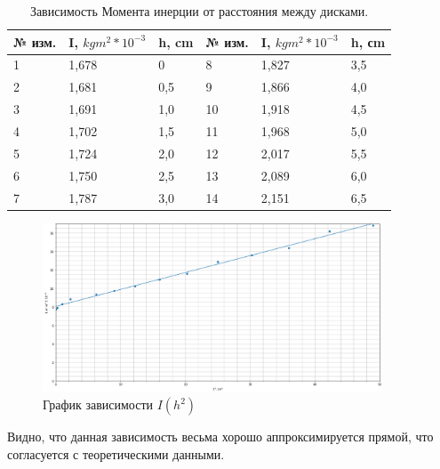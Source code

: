 \documentclass[a4, 12pt]{article}
\begin{document}
\begin{enumerate}
		\begin{table}[H]
			\begin{center}
				\begin{tabular}{| l | l | l || l | l | l |}
					\hline
					№ изм. & I, $kgm^2 * 10^{-3}$ & h, cm & № изм. & I, $kgm^2 * 10^{-3}$ & h, сm \\ \hline
					1 & 1,678 & 0 & 8 & 1,827 & 3,5 \\ \hline
					2 & 1,681 & 0,5 & 9 & 1,866 & 4,0 \\ \hline
					3 & 1,691 & 1,0 & 10 & 1,918 & 4,5 \\ \hline
					4 & 1,702 & 1,5 & 11 & 1,968 & 5,0 \\ \hline
					5 & 1,724 & 2,0 & 12 & 2,017 & 5,5 \\ \hline
					6 & 1,750 & 2,5 & 13 & 2,089 & 6,0 \\ \hline
					7 & 1,787 & 3,0 & 14 & 2,151 & 6,5 \\ \hline
				\end{tabular}
				\caption{Зависимость Момента инерции от расстояния между дисками.}
				\label{tab:moment}
			\end{center}
		\end{table}

		\begin{figure}[H]


			\begin{center}
				\includegraphics[width=0.9\textwidth]{1.2.3 graph.png}
				\caption{График зависимости $ I(h^2) $}
				\label{ris:grafik}
			\end{center}
		\end{figure}

		Видно, что данная зависимость весьма хорошо аппроксимируется прямой, что согласуется
		с теоретическими данными.

	\end{enumerate}
\end{document}
